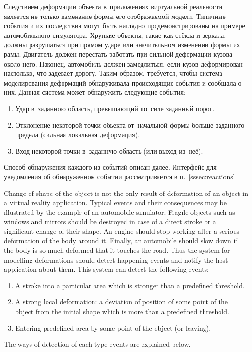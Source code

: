 \documentclass[a4paper, 12pt, titlepage]{extarticle}
\begin{document}
\begin{original}
        Следствием деформации объекта в~приложениях виртуальной реальности является не только
        изменение формы его отображаемой модели. Типичные события и их последствия могут быть
        наглядно продемонстрированы на примере автомобильного симулятора. Хрупкие объекты, такие как
        стёкла и зеркала, должны разрушаться при прямом ударе или значительном изменении формы их
        рамы. Двигатель должен перестать работать при сильной деформации кузова около него.
        Наконец, автомобиль должен замедлиться, если кузов деформирован настолько, что задевает
        дорогу. Таким образом, требуется, чтобы система моделирования деформаций обнаруживала
        происходящие события и сообщала о них. Данная система может обнаружить следующие события:
        \begin{enumerate}
          \item Удар в~заданною область, превышающий по~силе заданный порог.
          \item Отклонение некоторой точки объекта от~начальной формы больше заданного предела
          (сильная локальная деформация).
          \item Вход некоторой точки в~заданную область (или выход из~неё).
        \end{enumerate}
        Способ обнаружения каждого из событий описан далее. Интерфейс для уведомления об
        обнаруженном событии рассматривается в п.~\ref{sssec:reactions}.
\end{original}

        Change of shape of the object is not the only result of deformation of an object in a
        virtual reality application. Typical events and their consequences may be illustrated by the
        example of an automobile simulator. Fragile objects such as windows and mirrors should be
        destroyed in case of a direct stroke or a significant change of their shape. An engine
        should stop working after a serious deformation of the body around it. Finally, an
        automobile should slow down if the body is so much deformed that it touches the road.
        Thus the system for modelling deformations should detect happening events and notify the
        host application about them. This system can detect the following events:
        \begin{enumerate}
          \item A stroke into a particular area which is stronger than a predefined threshold.
          \item A strong local deformation: a deviation of position of some point of the object from
                the initial shape which is more than a predefined threshold.
          \item Entering predefined area by some point of the object (or leaving).
        \end{enumerate}
        The ways of detection of each type events are explained below.
\end{document}

